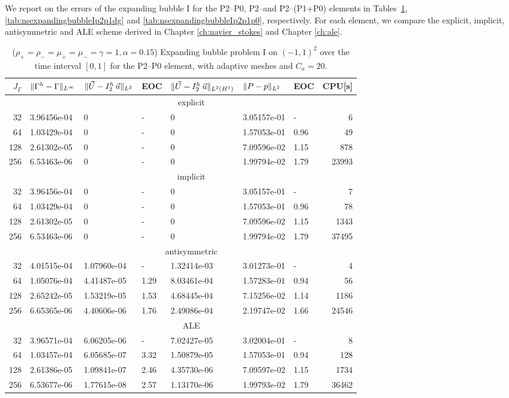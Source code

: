 We report on the errors of the expanding bubble I for the P2--P0, P2--\pdg and
P2--(P1+P0) elements in Tables~\ref{tab:nsexpandingbubbleIp2p0},
\ref{tab:nsexpandingbubbleIp2p1dg} and \ref{tab:nsexpandingbubbleIp2p1p0},
respectively. For each element, we compare the explicit, implicit,
antisymmetric and ALE scheme derived in Chapter \ref{ch:navier_stokes} and
Chapter \ref{ch:ale}.
\begin{table}
\center
\hspace*{-3.25cm}
\begin{tabular}{rllllllr}
\hline
$J_\Gamma$ & $\|\Gamma^h - \Gamma\|_{L^\infty}$ & $\|\vec U - I^h_{2}\,\vec u\|_{L^2}$ & EOC & $\|\vec U - I^h_{2}\,\vec u\|_{L^2(H^1)}$ & $\|P - p\|_{L^2}$ & EOC
& CPU[s] \\
\hline
& \multicolumn{7}{c}{explicit} \\
\hline
 32 & 3.96456e-04 & 0 & - & 0 & 3.05157e-01 &    - &     6 \\
 64 & 1.03429e-04 & 0 & - & 0 & 1.57053e-01 & 0.96 &    49 \\
128 & 2.61302e-05 & 0 & - & 0 & 7.09596e-02 & 1.15 &   878 \\
256 & 6.53463e-06 & 0 & - & 0 & 1.99794e-02 & 1.79 & 23993 \\
\hline
& \multicolumn{7}{c}{implicit} \\
\hline
 32 & 3.96456e-04 & 0 & - & 0 & 3.05157e-01 &    - &     7 \\
 64 & 1.03429e-04 & 0 & - & 0 & 1.57053e-01 & 0.96 &    78 \\
128 & 2.61302e-05 & 0 & - & 0 & 7.09596e-02 & 1.15 &  1343 \\
256 & 6.53463e-06 & 0 & - & 0 & 1.99794e-02 & 1.79 & 37495 \\
\hline
& \multicolumn{7}{c}{antisymmetric} \\
\hline
 32 & 4.01515e-04 & 1.07960e-04 &    - & 1.32414e-03 & 3.01273e-01 &    - &
4 \\
 64 & 1.05076e-04 & 4.41487e-05 & 1.29 & 8.03461e-04 & 1.57283e-01 & 0.94 &
56 \\
128 & 2.65242e-05 & 1.53219e-05 & 1.53 & 4.68445e-04 & 7.15256e-02 & 1.14 &
1186 \\
256 & 6.65365e-06 & 4.40606e-06 & 1.76 & 2.49086e-04 & 2.19747e-02 & 1.66 &
24546 \\
\hline
& \multicolumn{7}{c}{ALE} \\
\hline
 32 & 3.96571e-04 & 6.06205e-06 &    - & 7.02427e-05 & 3.02004e-01 &    - &
8 \\
 64 & 1.03457e-04 & 6.05685e-07 & 3.32 & 1.50879e-05 & 1.57053e-01 & 0.94 &
128 \\
128 & 2.61386e-05 & 1.09841e-07 & 2.46 & 4.35730e-06 & 7.09597e-02 & 1.15 &
1734 \\
256 & 6.53677e-06 & 1.77615e-08 & 2.57 & 1.13170e-06 & 1.99793e-02 & 1.79 &
36462 \\
\hline
\end{tabular}
\hspace*{-3.25cm}
\caption[Navier--Stokes expanding bubble I errors P2--P0]
{($\rho_+ = \rho_- = \mu_+ = \mu_- = \gamma = 1,\alpha=0.15$)
Expanding bubble problem I on $(-1,1)^2$ over the time interval $[0,1]$ for the
P2--P0 element, with adaptive meshes and $C_a=20$\textdegree.}
\label{tab:nsexpandingbubbleIp2p0}
\end{table}

